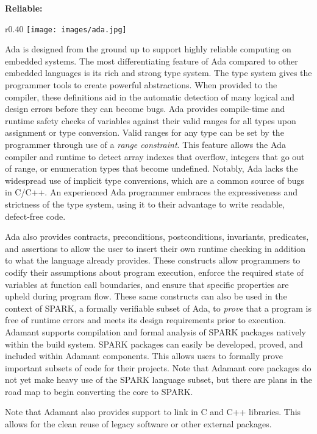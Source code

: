 \textbf{Reliable:} \\

\begin{wrapfigure}{r}{0.40\textwidth}
  \texttt{[image: images/ada.jpg]}
\end{wrapfigure}

Ada is designed from the ground up to support highly reliable computing on embedded systems. The most differentiating feature of Ada compared to other embedded languages is its rich and strong type system. The type system gives the programmer tools to create powerful abstractions. When provided to the compiler, these definitions aid in the automatic detection of many logical and design errors before they can become bugs. Ada provides compile-time and runtime safety checks of variables against their valid ranges for all types upon assignment or type conversion. Valid ranges for any type can be set by the programmer through use of a \textit{range constraint}. This feature allows the Ada compiler and runtime to detect array indexes that overflow, integers that go out of range, or enumeration types that become undefined. Notably, Ada lacks the widespread use of implicit type conversions, which are a common source of bugs in C/C++. An experienced Ada programmer embraces the expressiveness and strictness of the type system, using it to their advantage to write readable, defect-free code.

Ada also provides contracts, preconditions, postconditions, invariants, predicates, and assertions to allow the user to insert their own runtime checking in addition to what the language already provides. These constructs allow programmers to codify their assumptions about program execution, enforce the required state of variables at function call boundaries, and ensure that specific properties are upheld during program flow. These same constructs can also be used in the context of SPARK, a formally verifiable subset of Ada, to \textit{prove} that a program is free of runtime errors and meets its design requirements prior to execution. Adamant supports compilation and formal analysis of SPARK packages natively within the build system. SPARK packages can easily be developed, proved, and included within Adamant components. This allows users to formally prove important subsets of code for their projects. Note that Adamant core packages do not yet make heavy use of the SPARK language subset, but there are plans in the road map to begin converting the core to SPARK. 

Note that Adamant also provides support to link in C and C++ libraries. This allows for the clean reuse of legacy software or other external packages.

